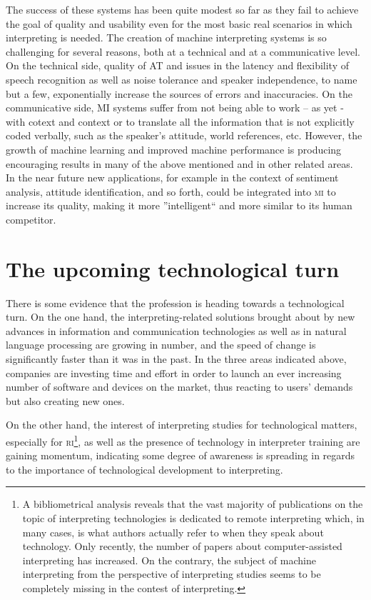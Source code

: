 \documentclass[output=paper]{langsci/langscibook}
\begin{document}
The success of these systems has been quite modest so far as they fail to achieve the goal of quality and usability even for the most basic real scenarios in which interpreting is needed. The creation of machine interpreting systems is so challenging for several reasons, both at a technical and at a communicative level. On the technical side, quality of AT and issues in the latency and flexibility of speech recognition as well as noise tolerance and speaker independence, to name but a few, exponentially increase the sources of errors and inaccuracies. On the communicative side, \textsc{MI} systems suffer from not being able to work – as yet - with cotext and context or to translate all the information that is not explicitly coded verbally, such as the speaker's attitude, world references, etc. However, the growth of machine learning and improved machine performance is producing encouraging results in many of the above mentioned and in other related areas. In the near future new applications, for example in the context of sentiment analysis, attitude identification, and so forth, could be integrated into \textsc{mi} to increase its quality, making it more ''intelligent`` and more similar to its human competitor. 
 
\section{The upcoming technological turn} 
There is some evidence that the profession is heading towards a technological turn. On the one hand, the interpreting-related solutions brought about by new advances in information and communication technologies as well as in natural language processing are growing in number, and the speed of change is significantly faster than it was in the past. In the three areas indicated above, companies are investing time and effort in order to launch an ever increasing number of software and devices on the market, thus reacting to users’ demands but also creating new ones.  
 
On the other hand, the interest of interpreting studies for technological matters, especially for \textsc{ri}\footnote{A bibliometrical analysis reveals that the vast majority of publications on the topic of interpreting technologies is dedicated to remote interpreting which, in many cases, is what authors actually refer to when they speak about technology. Only recently, the number of papers about computer-assisted interpreting has increased. On the contrary, the subject of machine interpreting from the perspective of interpreting studies seems to be completely missing in the contest of interpreting.}, as well as the presence of technology in interpreter training are gaining momentum, indicating some degree of awareness is spreading in regards to the importance of technological development to interpreting. 
 
\end{document}
